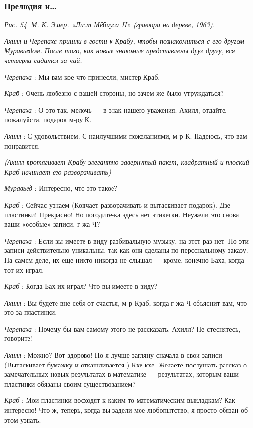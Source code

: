 \subsubsection{Прелюдия и\ldots{}}

\emph{Рис. 54. М. К. Эшер. «Лист Мёбиуса II» (гравюра на дереве, 1963).}

\emph{Ахилл и Черепаха пришли в гости к Крабу, чтобы познакомиться с его другом Муравьедом. После того, как новые знакомые представлены друг другу, вся четверка садится за чай.}

\emph{Черепаха} : Мы вам кое-что принесли, мистер Краб.

\emph{Краб} : Очень любезно с вашей стороны, но зачем же было утруждаться?

\emph{Черепаха} : О это так, мелочь --- в знак нашего уважения. Ахилл, отдайте, пожалуйста, подарок м-ру К.

\emph{Ахилл} : С удовольствием. С наилучшими пожеланиями, м-р К. Надеюсь, что вам понравится.

\emph{(Ахилл протягивает Крабу элегантно завернутый пакет, квадратный и плоский Краб начинает его разворачивать).}

\emph{Муравьед} : Интересно, что это такое?

\emph{Краб} : Сейчас узнаем (Кончает разворачивать и вытаскивает подарок). Две пластинки! Прекрасно! Но погодите-ка здесь нет этикетки. Неужели это снова ваши «особые» записи, г-жа Ч?

\emph{Черепаха} : Если вы имеете в виду разбивальную музыку, на этот раз нет. Но эти записи действительно уникальны, так как они сделаны по персональному заказу. На самом деле, их еще никто никогда не слышал --- кроме, конечно Баха, когда тот их играл.

\emph{Краб} : Когда Бах их играл? Что вы имеете в виду?

\emph{Ахилл} : Вы будете вне себя от счастья, м-р Краб, когда г-жа Ч объяснит вам, что это за пластинки.

\emph{Черепаха} : Почему бы вам самому этого не рассказать, Ахилл? Не стеснятесь, говорите!

\emph{Ахилл} : Можно? Вот здорово! Но я лучше загляну сначала в свои записи (Вытаскивает бумажку и откашливается ) Кхе-кхе. Желаете послушать рассказ о замечательных новых результатах в математике --- результатах, которым ваши пластинки обязаны своим существованием?

\emph{Краб} : Мои пластинки восходят к каким-то математическим выкладкам? Как интересно! Что ж, теперь, когда вы задели мое любопытство, я просто обязан об этом узнать.

